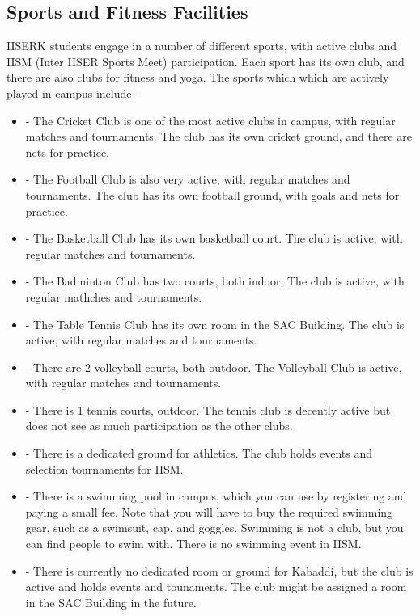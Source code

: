 \documentclass[openany]{book}
\begin{document}
\subsection{Sports and Fitness Facilities}
IISERK students engage in a number of different sports, with active clubs and IISM (Inter IISER Sports Meet) participation. Each sport has its own club, and there are also clubs for fitness and yoga. The sports which which are actively played in campus include -
\begin{itemize}
    \item {} - The Cricket Club is one of the most active clubs in campus, with regular matches and tournaments. The club has its own cricket ground, and there are nets for practice.
    \item {} - The Football Club is also very active, with regular matches and tournaments. The club has its own football ground, with goals and nets for practice. 
    \item {} - The Basketball Club has its own basketball court. The club is active, with regular matches and tournaments.
    \item {} - The Badminton Club has two courts, both indoor. The club is active, with regular mathches and tournaments.
    \item {} - The Table Tennis Club has its own room in the SAC Building. The club is active, with regular matches and tournaments.
    \item {} - There are 2 volleyball courts, both outdoor. The Volleyball Club is active, with regular matches and tournaments.
    \item {} - There is 1 tennis courts, outdoor. The tennis club is decently active but does not see as much participation as the other clubs.
    \item {} - There is a dedicated ground for athletics. The club holds events and selection tournaments for IISM.
    \item {} - There is a swimming pool in campus, which you can use by registering and paying a small fee. Note that you will have to buy the required swimming gear, such as a swimsuit, cap, and goggles. Swimming is not a club, but you can find people to swim with. There is no swimming event in IISM.
    \item {} - There is currently no dedicated room or ground for Kabaddi, but the club is active and holds events and tounaments. The club might be assigned a room in the SAC Building in the future.

\end{itemize}
\end{document}
